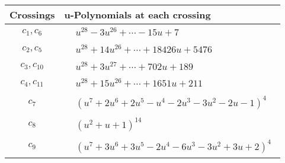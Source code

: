 \documentclass[1p]{elsarticle_modified}
\theoremstyle{definition}
\begin{document}
\begin{tabular}{m{50pt}|m{274pt}}
Crossings & \hspace{64pt}u-Polynomials at each crossing \\
\hline $$\begin{aligned}c_{1},c_{6}\end{aligned}$$&$\begin{aligned}
&u^{28}-3 u^{26}+\cdots-15 u+7
\end{aligned}$\\
\hline $$\begin{aligned}c_{2},c_{5}\end{aligned}$$&$\begin{aligned}
&u^{28}+14 u^{26}+\cdots+18426 u+5476
\end{aligned}$\\
\hline $$\begin{aligned}c_{3},c_{10}\end{aligned}$$&$\begin{aligned}
&u^{28}+3 u^{27}+\cdots+702 u+189
\end{aligned}$\\
\hline $$\begin{aligned}c_{4},c_{11}\end{aligned}$$&$\begin{aligned}
&u^{28}+15 u^{26}+\cdots+1651 u+211
\end{aligned}$\\
\hline $$\begin{aligned}c_{7}\end{aligned}$$&$\begin{aligned}
&(u^7+2 u^6+2 u^5- u^4-2 u^3-3 u^2-2 u-1)^4
\end{aligned}$\\
\hline $$\begin{aligned}c_{8}\end{aligned}$$&$\begin{aligned}
&(u^2+u+1)^{14}
\end{aligned}$\\
\hline $$\begin{aligned}c_{9}\end{aligned}$$&$\begin{aligned}
&(u^7+3 u^6+3 u^5-2 u^4-6 u^3-3 u^2+3 u+2)^4
\end{aligned}$\\
\hline
\end{tabular}\\~\\
\newpage\renewcommand{\arraystretch}{1}
\end{document}
